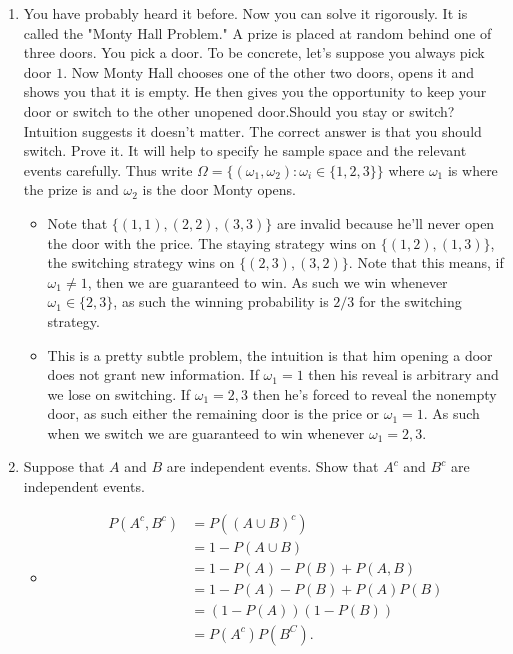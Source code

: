 \documentclass{article}
\begin{document}
\begin{enumerate}
	\item You have probably heard it before. Now you can solve it rigorously. It is called the "Monty Hall Problem." A prize is placed at random behind one of three doors. You pick a door. To be concrete, let's suppose you always pick door $1$. Now Monty Hall chooses one of the other two doors, opens it and shows you that it is empty. He then gives you the opportunity to keep your door or switch to the other unopened door.Should you stay or switch? Intuition suggests it doesn't matter. The correct answer is that you should switch. Prove it. It will help to specify he sample space and the relevant events carefully. Thus write $\Omega = \{(\omega_1, \omega_2): \omega_i \in \{1,2,3\}\}$ where $\omega_1$ is where the prize is and $\omega_2$ is the door Monty opens.
		\begin{itemize}
			\item Note that $\{(1, 1), (2, 2), (3, 3)\}$ are invalid because he'll never open the door with the price. The staying strategy wins on $\{(1, 2), (1, 3)\}$, the switching strategy wins on $\{(2, 3), (3, 2)\}$. Note that this means, if $\omega_1 \neq 1$, then we are guaranteed to win. As such we win whenever $\omega_1 \in \{2, 3\}$, as such the winning probability is $2/3$ for the switching strategy.
			\item This is a pretty subtle problem, the intuition is that him opening a door does not grant new information. If $\omega_1 = 1$ then his reveal is arbitrary and we lose on switching. If $\omega_1 = 2, 3$ then he's forced to reveal the nonempty door, as such either the remaining door is the price or $\omega_1 = 1$. As such when we switch we are guaranteed to win whenever $\omega_1 = 2, 3$.
		\end{itemize}
	\item Suppose that $A$ and $B$ are independent events. Show that $A^c$ and $B^c$ are independent events.
		\begin{itemize}
			\item
			$$
			\begin{aligned}
			P(A^c, B^c) &= P((A \cup B)^c) \\
			&= 1 - P(A \cup B) \\
			&= 1 - P(A) - P(B) + P(A, B) \\
			&= 1 - P(A) - P(B) + P(A)P(B) \\
			&= (1 - P(A))(1 - P(B)) \\
			&= P(A^c)P(B^C).
			\end{aligned}
			$$
		\end{itemize}

\end{enumerate}
\end{document}
